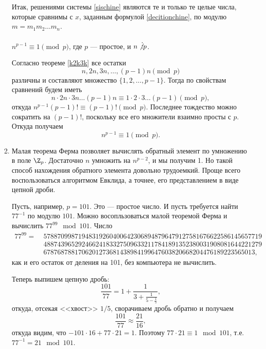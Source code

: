 \begin{enumerate}
Итак, решениями системы \eqref{sischine} являются те и только те целые числа, которые сравнимы с $x$, заданным формулой \eqref{decitionchine}, по модулю $m=m_1m_2\dots m_n$.
\epf




\begin{thrm}
$n^{p-1}\equiv 1\pmod p$, где $p$ --- простое, и $n\not\vdots p$.
\end{thrm}

Согласно теореме \ref{k2k3k} все остатки
$$
n,2n,3n,\dots,(p-1)n\pmod p
$$
различны и составляют множество $\{1,2,\dots,p-1\}$. Тогда по свойствам сравнений будем иметь
$$
n\cdot 2n\cdot 3n \dots(p-1)n\equiv 1\cdot 2\cdot 3\dots (p-1)\pmod p,
$$
откуда $n^{p-1}(p-1)!\equiv (p-1)!\pmod p$. Последнее тождество можно сократить на $(p-1)!$, поскольку все его множители взаимно просты с $p$. Откуда получаем
$$
n^{p-1}\equiv 1\pmod p.
$$

\item Малая теорема Ферма позволяет вычислять обратный элемент по умножению в поле $\Z_p$. Достаточно $n$ умножить на $n^{p-2}$, и мы получим 1. Но такой способ нахождения обратного элемента довольно трудоемкий. Проще всего воспользоваться алгоритмом Евклида, а точнее, его представлением в виде цепной дроби.

Пусть, например, $p=101$. Это --- простое число. И пусть требуется найти $77^{-1}$ по модулю $101$. Можно восопльзоваться малой теоремой Ферма и вычислить $77^{99}\mod 101$. Число
\begin{align*}
77^{99} =\; & 578870998719483192604006423068948796479127581676622586145657719 \\
            & 488743965292466241833275096332117841891352380031908081644221279 \\
            & 6787687881706201273681438984199647603820668204476189223565013,
\end{align*}
как и его остаток от деления на 101, без компьютера не вычислить.

Теперь выпишем цепную дробь:
$$
\frac{101}{77} = 1 + \frac{1}{3 + \frac{1}{5 - \frac 15}},
$$
откуда, отсекая <<хвост>> $1/5$, сворачиваем дробь обратно и получаем
$$
\frac{101}{77} \approx \frac{21}{16},
$$
откуда видим, что $-101\cdot 16 + 77\cdot 21 = 1$. Поэтому $77\cdot 21\equiv 1\mod 101$, т.е. $77^{-1}=21\mod 101$.

\end{enumerate}

